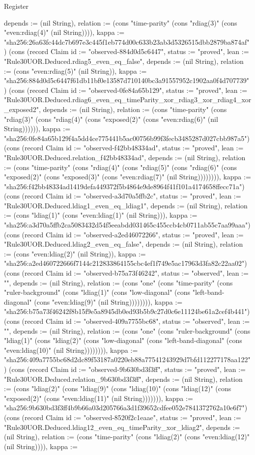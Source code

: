 \begin{lexlean}{Register}
\begin{semanticmodule}
{depends := (nil String), relation := (cons "time-parity" (cons "rdiag(3)" (cons "even:rdiag(4)" (nil String)))), kappa := "sha256:26a63fc44dc7b697e3c445f1eb774d00c633b23ab3d5326515dbb2879ba874af"}) (cons (record Claim {id := "observed-884d0d5c6447", status := "proved", lean := "Rule30UOR.Deduced.rdiag5_even_eq_false", depends := (nil String), relation := (cons "even:rdiag(5)" (nil String)), kappa := "sha256:884d0d5c6447f61db11bf0e13587d710140bc3a91557952c1902aa0f4d707739"}) (cons (record Claim {id := "observed-0fe84a65b129", status := "proved", lean := "Rule30UOR.Deduced.rdiag6_even_eq_timeParity_xor_rdiag3_xor_rdiag4_xor_exposed2", depends := (nil String), relation := (cons "time-parity" (cons "rdiag(3)" (cons "rdiag(4)" (cons "exposed(2)" (cons "even:rdiag(6)" (nil String)))))), kappa := "sha256:0fe84a65b129f4a5dd4ce775441b5ac00756b99f3fecb3485287d027cbb987a5"}) (cons (record Claim {id := "observed-f42bb48334ad", status := "proved", lean := "Rule30UOR.Deduced.relation_f42bb48334ad", depends := (nil String), relation := (cons "time-parity" (cons "rdiag(4)" (cons "rdiag(5)" (cons "rdiag(6)" (cons "exposed(2)" (cons "exposed(3)" (cons "even:rdiag(7)" (nil String)))))))), kappa := "sha256:f42bb48334ad1419defa449372f5b4864e9de8964f41f101a4174658ffecc71a"}) (cons (record Claim {id := "observed-a3d70a5ffb2c", status := "proved", lean := "Rule30UOR.Deduced.ldiag1_even_eq_ldiag1", depends := (nil String), relation := (cons "ldiag(1)" (cons "even:ldiag(1)" (nil String))), kappa := "sha256:a3d70a5ffb2ca5083432d54f5eeabdd031465c455ccb4cb0711ab55c7aa99aaa"}) (cons (record Claim {id := "observed-a2ed46072266", status := "proved", lean := "Rule30UOR.Deduced.ldiag2_even_eq_false", depends := (nil String), relation := (cons "even:ldiag(2)" (nil String)), kappa := "sha256:a2ed460722666f7144c212833864155cbc4ef1f749e5ac17963d3fa82c22aa02"}) (cons (record Claim {id := "observed-b75a73f46242", status := "observed", lean := "", depends := (nil String), relation := (cons "one" (cons "time-parity" (cons "ruler-background" (cons "ldiag(1)" (cons "low-diagonal" (cons "left-band-diagonal" (cons "even:ldiag(9)" (nil String)))))))), kappa := "sha256:b75a73f46242f8b15f9e5a8945db0ed93b5b9c27d0c6e11124be61a2cef4b441"}) (cons (record Claim {id := "observed-409a7755bc68", status := "observed", lean := "", depends := (nil String), relation := (cons "one" (cons "ruler-background" (cons "ldiag(1)" (cons "ldiag(2)" (cons "low-diagonal" (cons "left-band-diagonal" (cons "even:ldiag(10)" (nil String)))))))), kappa := "sha256:409a7755bc68d2dc89f53187a0220eb88a77541243929d7bfd112277178aa122"}) (cons (record Claim {id := "observed-9b630bd3f3ff", status := "proved", lean := "Rule30UOR.Deduced.relation_9b630bd3f3ff", depends := (nil String), relation := (cons "ldiag(2)" (cons "ldiag(9)" (cons "ldiag(10)" (cons "ldiag(12)" (cons "exposed(2)" (cons "even:ldiag(11)" (nil String))))))), kappa := "sha256:9b630bd3f3ff4b9b66a03d205766a3d1f39652cdfee052e7841372762a10e6f7"}) (cons (record Claim {id := "observed-8520f2c1eaae", status := "proved", lean := "Rule30UOR.Deduced.ldiag12_even_eq_timeParity_xor_ldiag2", depends := (nil String), relation := (cons "time-parity" (cons "ldiag(2)" (cons "even:ldiag(12)" (nil String)))), kappa := }
\end{semanticmodule}
\end{lexlean}
